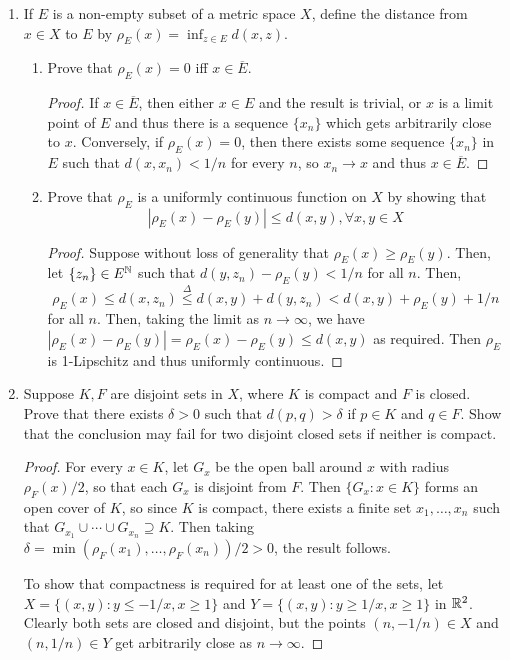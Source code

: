 \begin{enumerate}
\item %
If $E$ is a non-empty subset of a metric space $X$, define the distance from $x \in X$ to $E$ by $\rho_E(x) = \inf_{z \in E} d(x, z)$.
\begin{enumerate}
\item Prove that $\rho_E(x) = 0$ iff $x \in \overline{E}$.
    \begin{proof}
        If $x \in \overline{E}$, then either $x \in E$ and the result is trivial, or $x$ is a limit point of $E$ and thus there is a sequence $\{x_n\}$ which gets arbitrarily close to $x$. Conversely, if $\rho_E(x) = 0$, then there exists some sequence $\{x_n\}$ in $E$ such that $d(x, x_n) < 1/n$ for every $n$, so $x_n \to x$ and thus $x \in \overline{E}$.
    \end{proof}
\item Prove that $\rho_E$ is a uniformly continuous function on $X$ by showing that
\[
    |\rho_E(x) - \rho_E(y)| \le d(x, y), \forall x, y \in X
\]
\begin{proof}
    Suppose without loss of generality that $\rho_E(x) \ge \rho_E(y)$. Then, let $\{z_n\} \in E^{\mathbb{N}}$ such that $d(y, z_n) - \rho_E(y) < 1/n$ for all $n$. Then,
    \[
        \rho_E(x) \le d(x, z_n) \overset{\Delta}{\le} d(x, y) + d(y, z_n) < d(x, y) + \rho_E(y) + 1/n
    \]
    for all $n$.
Then, taking the limit as $n \to \infty$, we have $|\rho_E(x) - \rho_E(y)| = \rho_E(x) - \rho_E(y) \le d(x, y)$ as required. Then $\rho_E$ is 1-Lipschitz and thus uniformly continuous.
\end{proof}
\end{enumerate}

\item %
Suppose $K, F$ are disjoint sets in $X$, where $K$ is compact and $F$ is closed. Prove that there exists $\delta > 0$ such that $d(p, q) > \delta$ if $p \in K$ and $q \in F$. Show that the conclusion may fail for two disjoint closed sets if neither is compact.

\begin{proof}
    For every $x \in K$, let $G_x$ be the open ball around $x$ with radius $\rho_F(x) / 2$, so that each $G_x$ is disjoint from $F$. Then $\{G_x: x \in K\}$ forms an open cover of $K$, so since $K$ is compact, there exists a finite set $x_1, \dotsc, x_n$ such that $G_{x_1} \cup \dotsb \cup G_{x_n} \supseteq K$. Then taking $\delta = \min(\rho_F(x_1), \dotsc, \rho_F(x_n)) / 2 > 0$, the result follows.

    To show that compactness is required for at least one of the sets, let $X = \{(x, y): y \le -1/x, x \ge 1\}$ and $Y = \{(x, y): y \ge 1/x, x \ge 1\}$ in $\mathbb{R}^2$. Clearly both sets are closed and disjoint, but the points $(n, -1/n) \in X$ and $(n, 1/n) \in Y$ get arbitrarily close as $n \to \infty$.  
\end{proof}


\end{enumerate}

